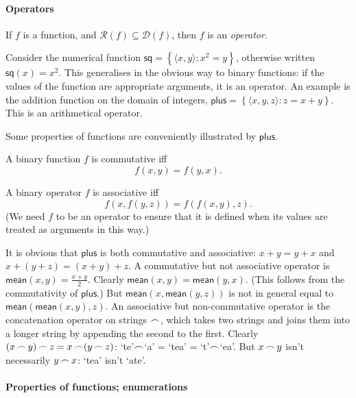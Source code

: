 \paragraph{Operators}
\begin{definition}[Operator]
	If $f$ is a function, and $\mathcal{R}(f) \subseteq \mathcal{D}(f)$, then $f$ is an \emph{operator}.
\end{definition}
Consider the numerical function $\mathsf{sq} = \left\{\langle x,y\rangle: x^{2} = y\right\}$, otherwise written $\mathsf{sq}(x) = x^2$. This generalises in the obvious way to binary functions: if the values of the function are appropriate arguments, it is an operator. An example is the addition function on the domain of integers, $\mathsf{plus} = \left\{\langle x, y, z\rangle : z = x + y\right\}$. This is an arithmetical operator.

Some properties of functions are conveniently illustrated by $\mathsf{plus}$.
\begin{definition}[Commutative]
	A binary function $f$ is commutative iff $$f(x,y) = f(y,x).$$  
\end{definition}
\begin{definition}[Associative]
	A binary operator $f$ is associative iff $$f(x,f(y,z)) = f(f(x,y),z).$$ (We need $f$ to be an operator to ensure that it is defined when its values are treated as arguments in this way.)
\end{definition}
It is obvious that $\mathsf{plus}$ is both commutative and associative: $x+y=y+x$ and $x+(y+z)=(x+y)+z$. A commutative but not associative operator is $\mathsf{mean}(x,y) = \tfrac{x+y}{2}$. Clearly $\mathsf{mean}(x,y)=\mathsf{mean}(y,x)$. (This follows from the commutativity of $\mathsf{plus}$.) But $\mathsf{mean}(x,\mathsf{mean}(y,z))$ is not in general equal to $\mathsf{mean}(\mathsf{mean}(x,y),z)$. An associative but non-commutative operator is the concatenation operator on strings $\mathop{\frown}$, which takes two strings and joins them into a longer string by appending the second to the first. Clearly $(x\mathop{\frown} y)\mathop{\frown} z = x \mathop{\frown} (y\mathop{\frown} z)$: `te'$\mathop{\frown}$`a' = `tea' = `t'$\mathop{\frown}$`ea'. But $x\mathop{\frown} y$ isn't necessarily $y\mathop{\frown} x$: `tea' isn't `ate'.



\paragraph{Properties of functions; enumerations}

